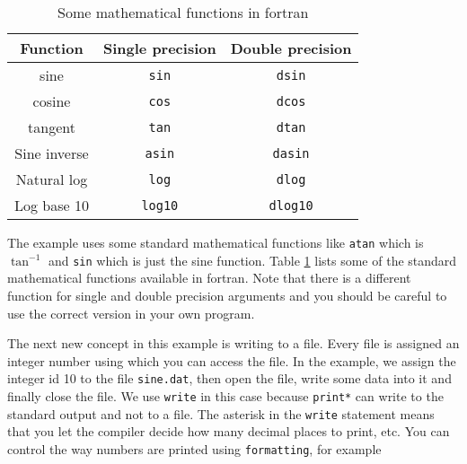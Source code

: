 \documentclass[11pt,oneside]{amsart}
\begin{document}
\begin{table}[htp]
\caption{Some mathematical functions in fortran}
\begin{center}
\begin{tabular}{|c|c|c|}
\hline
Function & Single precision & Double precision \\
\hline
sine & {\tt sin} & {\tt dsin} \\
\hline
cosine & {\tt cos} & {\tt dcos} \\
\hline
tangent & {\tt tan} & {\tt dtan} \\
\hline
Sine inverse & {\tt asin} & {\tt dasin} \\
\hline
Natural log & {\tt log} & {\tt dlog} \\
\hline
Log base 10 & {\tt log10} & {\tt dlog10} \\
\hline
\end{tabular}
\end{center}
\label{tab:math}
\end{table}%

The example uses some standard mathematical functions like {\tt atan} which is $\tan^{-1}$ and {\tt sin} which is just the sine function. Table \ref{tab:math} lists some of the standard mathematical functions available in fortran. Note that there is a different function for single and double precision arguments and you should be careful to use the correct version in your own program.

The next new concept in this example is writing to a file. Every file is assigned an integer number using which you can access the file. In the example, we assign the integer id 10 to the file {\tt sine.dat}, then open the file, write some data into it and finally close the file. We use {\tt write} in this case because {\tt print*} can write to the standard output and not to a file. The asterisk in the {\tt write} statement means that you let the compiler decide how many decimal places to print, etc. You can control the way numbers are printed using {\tt formatting}, for example
\end{document}
